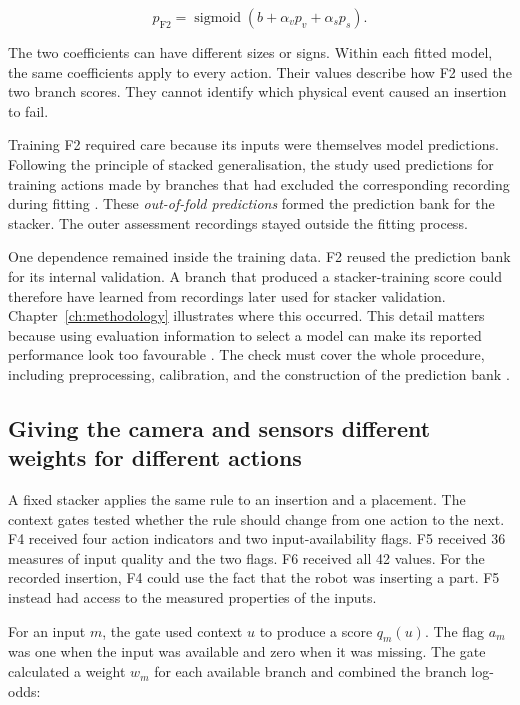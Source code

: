 \begin{equation}
p_{\mathrm{F2}}=\operatorname{sigmoid}(b+\alpha_v p_v+\alpha_s p_s).
\label{eq:f2}
\end{equation}

The two coefficients can have different sizes or signs. Within each fitted model, the same coefficients apply to every action. Their values describe how F2 used the two branch scores. They cannot identify which physical event caused an insertion to fail.

Training F2 required care because its inputs were themselves model predictions. Following the principle of stacked generalisation, the study used predictions for training actions made by branches that had excluded the corresponding recording during fitting \parencite{Ting1999Issues}. These \textit{out-of-fold predictions} formed the prediction bank for the stacker. The outer assessment recordings stayed outside the fitting process.

One dependence remained inside the training data. F2 reused the prediction bank for its internal validation. A branch that produced a stacker-training score could therefore have learned from recordings later used for stacker validation. Chapter~\ref{ch:methodology} illustrates where this occurred. This detail matters because using evaluation information to select a model can make its reported performance look too favourable \parencite{P004}. The check must cover the whole procedure, including preprocessing, calibration, and the construction of the prediction bank \parencite{P017}.

\subsection{Giving the camera and sensors different weights for different actions}

A fixed stacker applies the same rule to an insertion and a placement. The context gates tested whether the rule should change from one action to the next. F4 received four action indicators and two input-availability flags. F5 received 36 measures of input quality and the two flags. F6 received all 42 values. For the recorded insertion, F4 could use the fact that the robot was inserting a part. F5 instead had access to the measured properties of the inputs.

For an input \(m\), the gate used context \(u\) to produce a score \(q_m(u)\). The flag \(a_m\) was one when the input was available and zero when it was missing. The gate calculated a weight \(w_m\) for each available branch and combined the branch log-odds:

